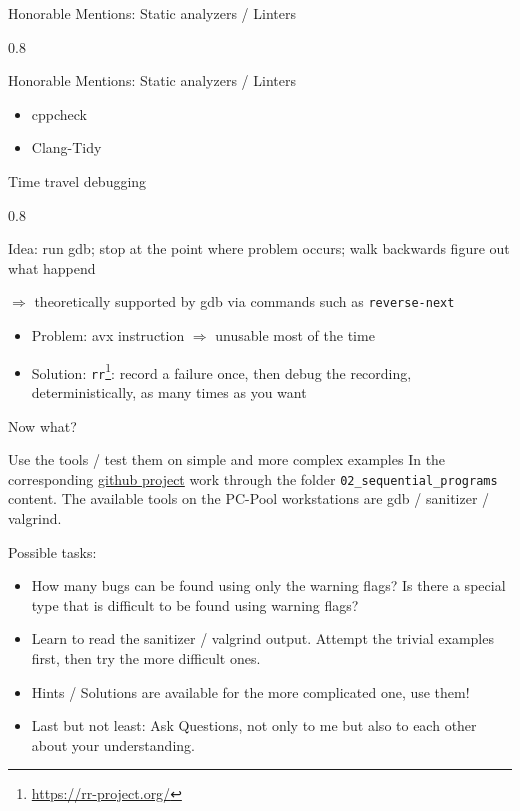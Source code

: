\documentclass[aspectratio=1610]{beamer}
\newenvironment{centeredblock}[2][0.8\textwidth]
{ %
	\begin{center}
		\begin{varwidth}{#1} %
			\begin{block}{#2}
				\centering
			}
			{ %
			\end{block}
		\end{varwidth}
	\end{center}
}
\begin{document}
	\begin{frame}[fragile]{Honorable Mentions: Static analyzers / Linters}
		
		\begin{centeredblock}{Honorable Mentions: Static analyzers / Linters}
			\begin{itemize}
				\item cppcheck
				\item Clang-Tidy
			\end{itemize}
		\end{centeredblock}
	\end{frame}
	
	\begin{frame}[fragile]{Time travel debugging}
		\begin{centeredblock}{}
			Idea: run gdb; stop at the point where problem occurs; walk backwards figure out what happend
			
			$\Rightarrow$ theoretically supported by gdb via commands such as \texttt{reverse-next}
			\begin{itemize}
				\item Problem: avx instruction $\Rightarrow$ unusable most of the time
				\item Solution: \texttt{rr}\footnote{\href{rr}{https://rr-project.org/}}: record a failure once, then debug the recording, deterministically, as many times as you want
			\end{itemize}
		\end{centeredblock}
	\end{frame}

\begin{frame}[fragile]{Now what?}
	\begin{block}{Use the tools / test them on simple and more complex examples}
		In the corresponding \href{https://github.com/joscao/cpp-debugging}{github project} work through the folder \texttt{02\_sequential\_programs} content. The available tools on the PC-Pool workstations are gdb / sanitizer / valgrind.
	
		\vspace{1cm}
	
		Possible tasks:
		\begin{itemize}
			\item How many bugs can be found using only the warning flags? Is there a special type that is difficult to be found using warning flags?
			\item Learn to read the sanitizer / valgrind output. Attempt the trivial examples first, then try the more difficult ones.
			\item Hints / Solutions are available for the more complicated one, use them!
			\item Last but not least: Ask Questions, not only to me but also to each other about your understanding.
		\end{itemize}
	\end{block}
\end{frame}
\end{document}
